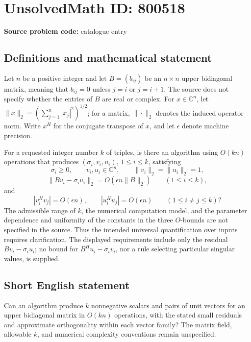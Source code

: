 \documentclass[11pt]{article}
\newcommand{\C}{\mathbb{C}}
\begin{document}
\section*{UnsolvedMath ID: 800518}
\textbf{Source problem code:} catalogue entry
\subsection{Definitions and mathematical statement}
Let \(n\) be a positive integer and let \(B=(b_{ij})\) be an \(n\times n\) upper bidiagonal matrix, meaning that \(b_{ij}=0\) unless \(j=i\) or \(j=i+1\). The source does not specify whether the entries of \(B\) are real or complex. For \(x\in\C^n\), let \(\|x\|_2=(\sum_{j=1}^n|x_j|^2)^{1/2}\); for a matrix, \(\|\cdot\|_2\) denotes the induced operator norm. Write \(x^H\) for the conjugate transpose of \(x\), and let \(\epsilon\) denote machine precision.

For a requested integer number \(k\) of triples, is there an algorithm using \(O(kn)\) operations that produces \((\sigma_i,v_i,u_i)\), \(1\leq i\leq k\), satisfying
\[
\sigma_i\geq0,\qquad v_i,u_i\in\C^n,\qquad \|v_i\|_2=\|u_i\|_2=1,
\]
\[
\|Bv_i-\sigma_i u_i\|_2=O(\epsilon n\|B\|_2)
\qquad(1\leq i\leq k),
\]
and
\[
|v_i^Hv_j|=O(\epsilon n),\qquad |u_i^Hu_j|=O(\epsilon n)
\qquad(1\leq i\neq j\leq k)?
\]
The admissible range of \(k\), the numerical computation model, and the parameter dependence and uniformity of the constants in the three \(O\)-bounds are not specified in the source. Thus the intended universal quantification over inputs requires clarification. The displayed requirements include only the residual \(Bv_i-\sigma_i u_i\); no bound for \(B^Hu_i-\sigma_i v_i\), nor a rule selecting particular singular values, is supplied.
\subsection{Short English statement}
Can an algorithm produce \(k\) nonnegative scalars and pairs of unit vectors for an upper bidiagonal matrix in \(O(kn)\) operations, with the stated small residuals and approximate orthogonality within each vector family? The matrix field, allowable \(k\), and numerical complexity conventions remain unspecified.
\end{document}
